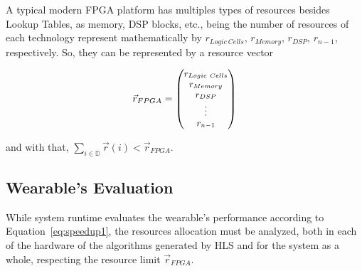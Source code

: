             A typical modern FPGA platform has multiples types of resources besides Lookup Tables, as memory, DSP blocks, etc., being the number of resources of each technology represent mathematically by $r_{Logic\ Cells}$, $r_{Memory}$, $r_{DSP}$, $r_{n-1} $, respectively.
            So, they can be represented by a resource vector
            
                     \begin{equation} \footnotesize 
                        \vec{r}_{FPGA} =
                        \begin{pmatrix}
                        r_{Logic\ Cells} \\
                        r_{Memory}\\
                        r_{DSP}\\
                        \vdots \\
                        r_{n-1}
                        \end{pmatrix}
                     \end{equation}
            
            and with that,
            $\sum_{i \in \mathbb{D}} \vec{r}(i) < \vec{r}_{FPGA}$.
    
    
    \subsection{Wearable's Evaluation}
        
        While system runtime evaluates the wearable's performance according to Equation~\ref{eq:speedup1}, the resources allocation must be analyzed, both in each of the hardware of the algorithms generated by HLS and for the system as a whole, respecting the resource limit $ \vec{r}_{FPGA}$.
        
